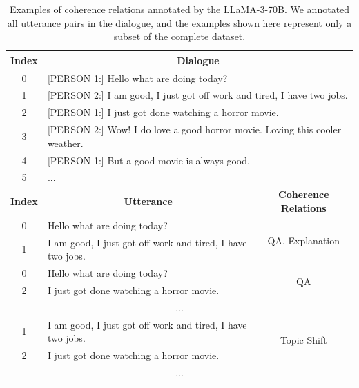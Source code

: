 \begin{table}[H]
\centering
\def\arraystretch{1.4}%
\begin{tabular}{|c|l|c|}
\hline

\rowcolor[RGB]{204,217,245}
\textbf{Index} & \multicolumn{2}{|c|}{\textbf{Dialogue}} \\
\hline

0 & \multicolumn{2}{|p{14cm}|}{[PERSON 1:] Hello what are doing today?} \\
\cline{1-1}
1 & \multicolumn{2}{|p{14cm}|}{[PERSON 2:] I am good, I just got off work and tired, I have two jobs.} \\
\cline{1-1}
2 & \multicolumn{2}{|p{14cm}|}{[PERSON 1:] I just got done watching a horror movie.} \\
\cline{1-1}
3 & \multicolumn{2}{|p{14cm}|}{[PERSON 2:] Wow! I do love a good horror movie. Loving this cooler weather.} \\
\cline{1-1}
4 & \multicolumn{2}{|p{14cm}|}{[PERSON 1:] But a good movie is always good.} \\
\cline{1-1}
5 & \multicolumn{2}{|p{14cm}|}{...} \\
\hline

\rowcolor[RGB]{204,217,245}
\textbf{Index} & \multicolumn{1}{|c|}{\textbf{Utterance}} & \textbf{Coherence Relations} \\
\hline

0 & Hello what are doing today? & \multirow{2}{*}{QA, Explanation} \\
\cline{1-2}
1 & I am good, I just got off work and tired, I have two jobs. & \\
\hline

0 & Hello what are doing today? & \multirow{2}{*}{QA} \\
\cline{1-2}
2 & I just got done watching a horror movie. & \\

\hline
\multicolumn{3}{|c|}{...} \\
\hline

1 & I am good, I just got off work and tired, I have two jobs. & \multirow{2}{*}{Topic Shift} \\
\cline{1-2}
2 & I just got done watching a horror movie. & \\
\hline

\multicolumn{3}{|c|}{...} \\
\hline

\end{tabular}
\caption{Examples of coherence relations annotated by the LLaMA-3-70B\protect\footnotemark\cite{llama3modelcard}. We annotated all utterance pairs in the dialogue, and the examples shown here represent only a subset of the complete dataset.}
\label{table:coherence-relations-annotated-example}
\end{table}

